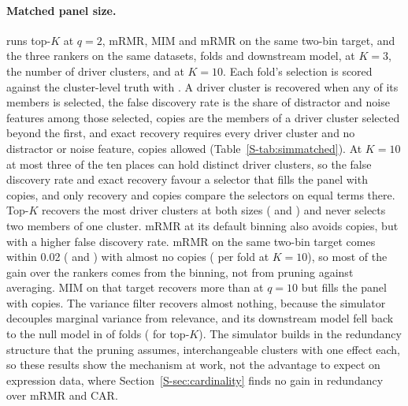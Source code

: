 \begin{table}[htbp]
\centering\footnotesize
\caption{Failures of the two self-sizing  modes in the simulation grid, as
percentages of the \SuppSimReps{} replicates of each configuration, with Monte Carlo
standard errors in brackets. Empty: no outer fold selected any feature. All failed: every
outer fold failed, because it selected fewer than the two features the downstream model
needs. Events: mean (Monte Carlo standard error). $^{\dagger}$Reference configuration.}
\label{S-tab:simulation}

\end{table}

\paragraph{Matched panel size.}  runs top-$K$ at $q = 2$, mRMR,
MIM and mRMR on the same two-bin target, and the three rankers on the same
\SuppSimDatasets{} datasets, folds and downstream model,
at $K = 3$, the number of driver clusters, and at $K = 10$. Each fold's selection is scored
against the cluster-level truth with . A driver
cluster is recovered when any of its members is selected, the false discovery rate is the
share of distractor and noise features among those selected, copies are the members of a
driver cluster selected beyond the first, and exact recovery requires every driver cluster
and no distractor or noise feature, copies allowed (Table~\ref{S-tab:simmatched}). At
$K = 10$ at most three of the ten places can hold distinct driver clusters, so the false
discovery rate and exact recovery favour a selector that fills the panel with copies, and
only recovery and copies compare the selectors on equal terms there. Top-$K$ recovers the
most driver clusters at both sizes (\SuppSimTopkThree{} and \SuppSimTopkTen) and never
selects two members of one cluster. mRMR at its default binning also avoids copies, but
with a higher false discovery rate. mRMR on the same two-bin target comes within 0.02
(\SuppSimMrmrQtwoThree{} and \SuppSimMrmrQtwoTen) with almost no copies
(\SuppSimMrmrQtwoCopies{} per fold at $K = 10$), so most of the gain over the rankers comes
from the binning, not from pruning against averaging. MIM on that target recovers more
than at $q = 10$ but fills the panel with copies. The variance filter recovers almost
nothing, because the simulator decouples marginal variance from relevance, and its
downstream model fell back to the null model in \SuppSimMNullVar{} of \SuppSimMFolds{} folds
(\SuppSimMNullTopk{} for top-$K$). The simulator builds in the redundancy structure that the
pruning assumes, interchangeable clusters with one effect each, so these results show the
mechanism at work, not the advantage to expect on expression data, where
Section~\ref{S-sec:cardinality} finds no gain in redundancy over mRMR and CAR.

